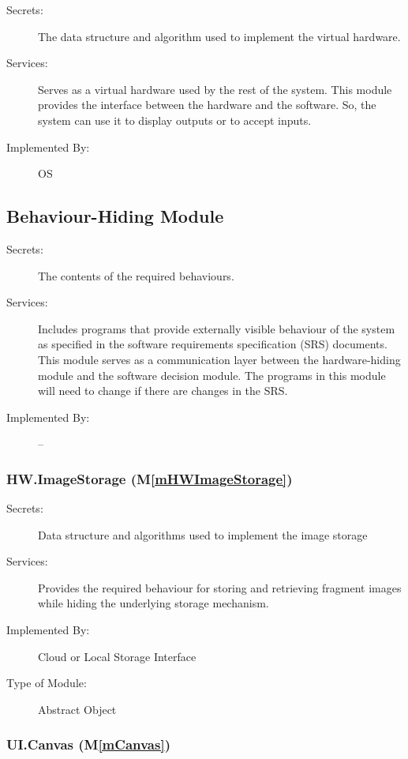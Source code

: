 \documentclass[12pt, titlepage]{article}
\newcommand{\mref}[1]{M\ref{#1}}
\begin{document}
\begin{description}
\item[Secrets:]The data structure and algorithm used to implement the virtual
  hardware.
\item[Services:]Serves as a virtual hardware used by the rest of the
  system. This module provides the interface between the hardware and the
  software. So, the system can use it to display outputs or to accept inputs.
\item[Implemented By:] OS
\end{description}



\subsection{Behaviour-Hiding Module}

\begin{description}
\item[Secrets:]The contents of the required behaviours.
\item[Services:]Includes programs that provide externally visible behaviour of
  the system as specified in the software requirements specification (SRS)
  documents. This module serves as a communication layer between the
  hardware-hiding module and the software decision module. The programs in this
  module will need to change if there are changes in the SRS.
\item[Implemented By:] --
\end{description}

\subsubsection{HW.ImageStorage (\mref{mHWImageStorage})}

\begin{description}
\item[Secrets:] Data structure and algorithms used to implement the image storage
\item[Services:] Provides the required behaviour for storing and retrieving fragment images while hiding the underlying storage mechanism.
\item[Implemented By:] Cloud or Local Storage Interface
\item[Type of Module:] Abstract Object
\end{description}

\subsubsection{UI.Canvas (\mref{mCanvas})}
\end{document}
